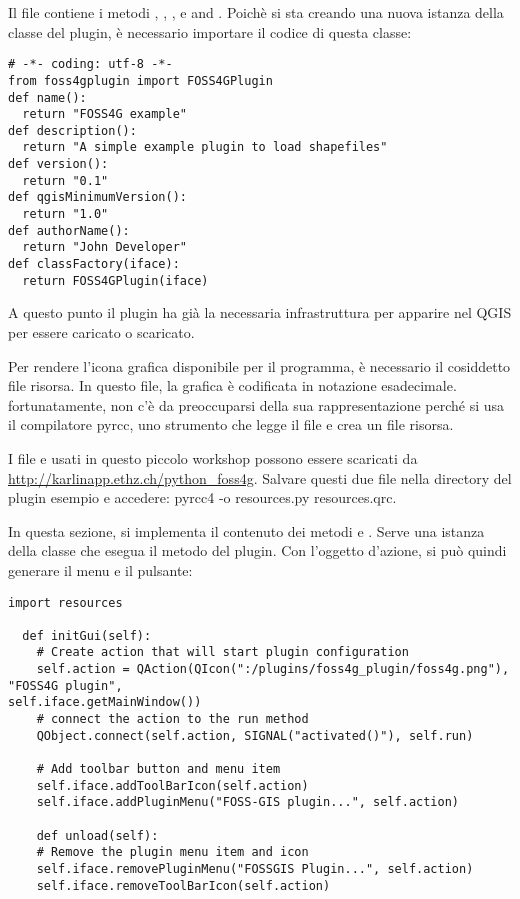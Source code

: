 Il file  contiene i metodi ,
, , 
e  and . Poichè si sta creando una nuova istanza della classe del plugin, è necessario importare il codice di questa classe:

\begin{verbatim}
# -*- coding: utf-8 -*-
from foss4gplugin import FOSS4GPlugin
def name():
  return "FOSS4G example"
def description():
  return "A simple example plugin to load shapefiles"
def version():
  return "0.1"
def qgisMinimumVersion():
  return "1.0"
def authorName():
  return "John Developer"
def classFactory(iface):
  return FOSS4GPlugin(iface)
\end{verbatim}

A questo punto il plugin ha già la necessaria infrastruttura per apparire nel QGIS  per essere caricato o scaricato.


Per rendere l'icona grafica disponibile per il programma, è necessario il cosiddetto file risorsa. In questo file, la grafica è codificata in notazione esadecimale. fortunatamente, non c'è da preoccuparsi della sua rappresentazione perché si usa il compilatore pyrcc, uno strumento che legge il file  e crea un file risorsa.

I file  e  usati in questo piccolo workshop possono essere scaricati da
\url{http://karlinapp.ethz.ch/python\_foss4g}. Salvare questi due file nella directory del plugin esempio
 e accedere: pyrcc4 -o
resources.py resources.qrc.


In questa sezione, si implementa il contenuto dei metodi  e
. Serve una istanza della classe  che esegua il
 metodo del plugin. Con l'oggetto d'azione, si può quindi generare il menu e il pulsante:

\begin{verbatim}
import resources

  def initGui(self):
    # Create action that will start plugin configuration
    self.action = QAction(QIcon(":/plugins/foss4g_plugin/foss4g.png"), "FOSS4G plugin",
self.iface.getMainWindow())
    # connect the action to the run method
    QObject.connect(self.action, SIGNAL("activated()"), self.run)

    # Add toolbar button and menu item
    self.iface.addToolBarIcon(self.action)
    self.iface.addPluginMenu("FOSS-GIS plugin...", self.action)

    def unload(self):
    # Remove the plugin menu item and icon
    self.iface.removePluginMenu("FOSSGIS Plugin...", self.action)
    self.iface.removeToolBarIcon(self.action)
\end{verbatim}


